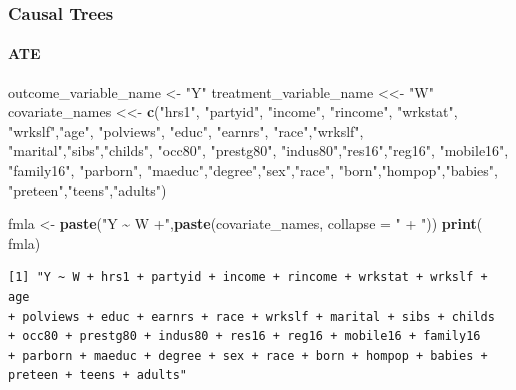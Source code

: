 \documentclass[
  shownotes,
  xcolor={svgnames},
  hyperref={colorlinks,citecolor=DarkBlue,linkcolor=DarkRed,urlcolor=DarkBlue}
  , aspectratio=169]{beamer}
\newenvironment{Shaded}{\begin{snugshade}}{\end{snugshade}}
\newcommand{\DataTypeTok}[1]{\textcolor[rgb]{0.13,0.29,0.53}{#1}}
\newcommand{\KeywordTok}[1]{\textcolor[rgb]{0.13,0.29,0.53}{\textbf{#1}}}
\newcommand{\NormalTok}[1]{#1}
\newcommand{\StringTok}[1]{\textcolor[rgb]{0.31,0.60,0.02}{#1}}
\begin{document}
\begin{frame}[fragile]
\frametitle{Causal Trees}
\framesubtitle{ATE}
\begin{scriptsize}
\begin{Shaded}
\begin{Highlighting}[]
\NormalTok{outcome\_variable\_name \textless{}{-}}\StringTok{ "Y"}
\NormalTok{treatment\_variable\_name \textless{}\textless{}{-}}\StringTok{ "W"}
\NormalTok{covariate\_names \textless{}\textless{}{-}}\StringTok{ }\KeywordTok{c}\NormalTok{(}\StringTok{"hrs1"}\NormalTok{, }\StringTok{"partyid"}\NormalTok{, }\StringTok{"income"}\NormalTok{, }\StringTok{"rincome"}\NormalTok{, }
                      \StringTok{"wrkstat"}\NormalTok{, }\StringTok{"wrkslf"}\NormalTok{,}\StringTok{"age"}\NormalTok{, }\StringTok{"polviews"}\NormalTok{,}
                      \StringTok{"educ"}\NormalTok{, }\StringTok{"earnrs"}\NormalTok{, }\StringTok{"race"}\NormalTok{,}\StringTok{"wrkslf"}\NormalTok{,}
                      \StringTok{"marital"}\NormalTok{,}\StringTok{"sibs"}\NormalTok{,}\StringTok{"childs"}\NormalTok{, }\StringTok{"occ80"}\NormalTok{,  }
                      \StringTok{"prestg80"}\NormalTok{, }\StringTok{"indus80"}\NormalTok{,}\StringTok{"res16"}\NormalTok{,}\StringTok{"reg16"}\NormalTok{,}
                      \StringTok{"mobile16"}\NormalTok{, }\StringTok{"family16"}\NormalTok{, }\StringTok{"parborn"}\NormalTok{,}
                      \StringTok{"maeduc"}\NormalTok{,}\StringTok{"degree"}\NormalTok{,}\StringTok{"sex"}\NormalTok{,}\StringTok{"race"}\NormalTok{,}
                      \StringTok{"born"}\NormalTok{,}\StringTok{"hompop"}\NormalTok{,}\StringTok{"babies"}\NormalTok{,}
                      \StringTok{"preteen"}\NormalTok{,}\StringTok{"teens"}\NormalTok{,}\StringTok{"adults"}\NormalTok{)}

\NormalTok{fmla \textless{}{-}}\StringTok{ }\KeywordTok{paste}\NormalTok{(}\StringTok{"Y \textasciitilde{} W +"}\NormalTok{,}\KeywordTok{paste}\NormalTok{(covariate\_names, }\DataTypeTok{collapse =} \StringTok{" + "}\NormalTok{))}
\KeywordTok{print}\NormalTok{( fmla)}
\end{Highlighting}
\end{Shaded}
\end{scriptsize}

\begin{tiny}
\begin{verbatim}
[1] "Y ~ W + hrs1 + partyid + income + rincome + wrkstat + wrkslf + age 
+ polviews + educ + earnrs + race + wrkslf + marital + sibs + childs 
+ occ80 + prestg80 + indus80 + res16 + reg16 + mobile16 + family16 
+ parborn + maeduc + degree + sex + race + born + hompop + babies + preteen + teens + adults"
\end{verbatim}
\end{tiny}

\end{frame}
\end{document}
